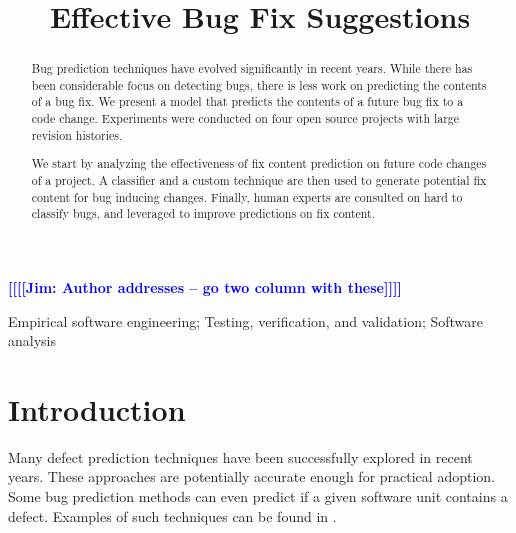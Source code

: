 \documentclass[10pt, conference, letterpaper, compsocconf]{IEEEtran}
\newcommand{\todoc}[2]{{\textcolor{#1} {\textbf{[[#2]]}}}}
\newcommand{\todoblue}[1]{\todoc{blue}{\textbf{[[#1]]}}}
\newcommand{\jim}[1]{\todoblue{Jim: #1}}
\begin{document}
\title{Effective Bug Fix Suggestions}

\author{
}

\maketitle
\jim{Author addresses -- go two column with these}

\begin{abstract}

Bug prediction techniques have evolved significantly in recent years.
While there has been considerable focus on detecting bugs, there is
less work on predicting the contents of a bug fix. We present a model
that predicts the contents of a future bug fix to a code change. Experiments
were conducted on four open source projects with large revision histories.

We start by analyzing the effectiveness of fix content prediction on future
code changes of a project. A classifier and a custom technique are then
used to generate potential fix content for bug inducing changes. Finally, human experts are consulted on hard to classify
bugs, and leveraged to improve predictions
on fix content.\end{abstract}
\begin{IEEEkeywords}
Empirical software engineering; Testing, verification, and validation;
Software analysis 
\end{IEEEkeywords}

\section{Introduction}
Many defect prediction techniques have been successfully explored in recent
years. These approaches are potentially accurate
enough for practical adoption. Some bug prediction methods can even
predict if a given software unit contains a defect. Examples of such techniques
can be found in \cite{Kim2007p58, shivaji2009reducing, aversano2007lbi, Hata2008}.
\end{document}
